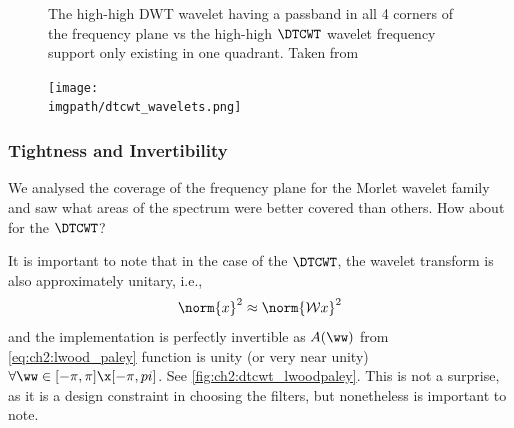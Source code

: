   \begin{figure}
      \newline
              { The high-high DWT wavelet having a passband in
              all 4 corners of the frequency plane vs  the
              high-high $\DTCWT$ wavelet frequency support only existing in one
              quadrant. Taken from \cite{selesnick_dual-tree_2005}}
      \label{fig:ch2:dwt_dtcwt_hh}
  \end{figure}
  \begin{figure}
    \centering
      \texttt{[image: \\imgpath/dtcwt\_wavelets.png]}
      \label{fig:ch2:dtcwt_wavelets}
  \end{figure}

\subsubsection{Tightness and Invertibility}
  We analysed the coverage of the frequency plane for the Morlet wavelet family
  and saw what areas of the spectrum were better covered than others. How about
  for the $\DTCWT$?

  It is important to note that in the case of the $\DTCWT$, the wavelet
  transform is also approximately unitary, i.e.,\
  \begin{equation}
    \norm{x}^2 \approx \norm{\mathcal{W}x}^2
  \end{equation}
  and the implementation is perfectly invertible as $A(\ww)$ from
  \eqref{eq:ch2:lwood_paley}
  function is unity (or very near unity) $\forall \ww \in [-\pi, \pi]\x [-\pi,
  pi]$. See
  \autoref{fig:ch2:dtcwt_lwoodpaley}. This is not a surprise, as it is a design
  constraint in choosing the filters, but nonetheless is important to note. 

